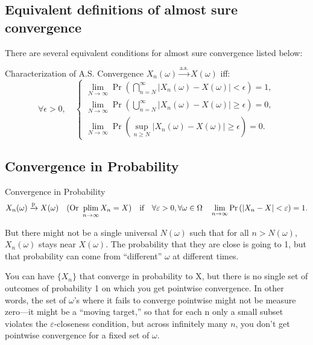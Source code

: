 \subsection{Equivalent definitions of almost sure convergence}
\noindent There are several equivalent conditions for almost sure convergence listed below: 
\begin{thm}{Characterization of A.S. Convergence}
$X_n(\omega) \xrightarrow{\text{a.s.}} X(\omega)$ iff: 
\[
\forall \epsilon > 0, \quad 
\begin{cases}
\lim_{N \to \infty} \Pr\left(\bigcap_{n=N}^\infty |X_n(\omega) - X(\omega)| < \epsilon\right) = 1, \\
\lim_{N \to \infty} \Pr\left(\bigcup_{n=N}^\infty |X_n(\omega) - X(\omega)| \geq \epsilon\right) = 0, \\
\lim_{N \to \infty} \Pr\left(\sup_{n \geq N} |X_n(\omega) - X(\omega)| \geq \epsilon\right) = 0.
\end{cases}
\]
\end{thm}

\subsection{Convergence in Probability}
\begin{thm}{Convergence in Probability}
\[
X_n(\omega) \xrightarrow{\text{p}} X(\omega) \quad (\text{Or } \operatorname*{plim}_{n\to\infty} X_n = X) \quad \text{if}\quad \forall \varepsilon > 0, \forall \omega\in \Omega \quad \lim_{n \to \infty} \Pr\left(|X_n - X| < \varepsilon\right) = 1.
\]

But there might not be a single universal $N(\omega)$ such that for all $n > N(\omega)$, $X_n(\omega)$ stays near $X(\omega)$. The probability that they are close is going to 1, but that probability can come from “different” $\omega$ at different times.
\end{thm}

\begin{rmk}
You can have $\{X_n\}$ that converge in probability to X, but there is no single set of outcomes of probability 1 on which you get pointwise convergence. In other words, the set of $\omega$’s where it fails to converge pointwise might not be measure zero—it might be a “moving target,” so that for each n only a small subset violates the $\varepsilon$-closeness condition, but across infinitely many $n$, you don’t get pointwise convergence for a fixed set of $\omega$.
\end{rmk}

